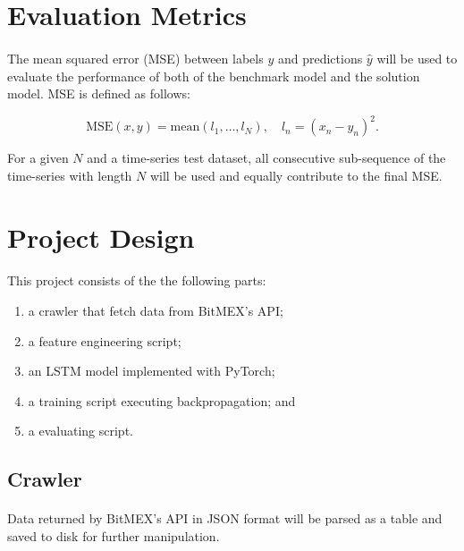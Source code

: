 \documentclass[12pt, letterpaper]{article}
\begin{document}
\section{Evaluation Metrics}

\paragraph{}
The mean squared error (MSE) between labels $y$ and predictions $\hat y$ will be used to evaluate the performance of both of the benchmark model and the solution model. MSE is defined as follows:

\begin{equation*}
\mathrm{MSE}(x,y)=\mathrm{mean}\left(l_1,\dots,l_N\right), \quad l_n=\left(x_n-y_n\right)^2.
\end{equation*}

For a given $N$ and a time-series test dataset, all consecutive sub-sequence of the time-series with length $N$ will be used and equally contribute to the final MSE.

\section{Project Design}

\paragraph{}
This project consists of the the following parts:

\begin{enumerate}
    \item a crawler that fetch data from BitMEX's API;
    \item a feature engineering script;
    \item an LSTM model implemented with PyTorch;
    \item a training script executing backpropagation; and
    \item a evaluating script.
\end{enumerate}

\subsection{Crawler}

\paragraph{}
Data returned by BitMEX's API in JSON format will be parsed as a table and saved to disk for further manipulation.
\end{document}
